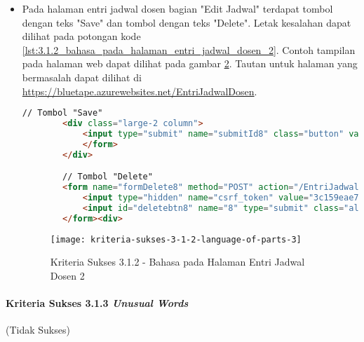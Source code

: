 \begin{itemize}
    \begin{figure}[H]
        \centering  
        \texttt{[image: kriteria-sukses-3-1-2-language-of-parts-2]}  
        \caption[Kriteria Sukses 3.1.2 - Bahasa pada Halaman Entri Jadwal Dosen 1]{Kriteria Sukses 3.1.2 - Bahasa pada Halaman Entri Jadwal Dosen 1}
        \label{fig:3.1.2_language_of_parts_2}  
    \end{figure}
    
    \item Pada halaman entri jadwal dosen bagian "Edit Jadwal" terdapat tombol dengan teks "Save" dan tombol dengan teks "Delete". Letak kesalahan dapat dilihat pada potongan kode \ref{lst:3.1.2_bahasa_pada_halaman_entri_jadwal_dosen_2}. Contoh tampilan pada halaman web dapat dilihat pada gambar \ref{fig:3.1.2_language_of_parts_3}. Tautan untuk halaman yang bermasalah dapat dilihat di \url{https://bluetape.azurewebsites.net/EntriJadwalDosen}.
    \begin{lstlisting}[frame=single, label={lst:3.1.2_bahasa_pada_halaman_entri_jadwal_dosen_2}, language=HTML, caption=Kriteria Sukses 3.1.2 - Bahasa yang Tidak Sesuai pada Halaman Entri Jadwal Dosen 2]
        // Tombol "Save"
        <div class="large-2 column">
            <input type="submit" name="submitId8" class="button" value="Save">
            </form>
        </div>

        // Tombol "Delete"
        <form name="formDelete8" method="POST" action="/EntriJadwalDosen/delete/8">    
            <input type="hidden" name="csrf_token" value="3c159eae7bc953dd591b679c080ed066"/>
            <input id="deletebtn8" name="8" type="submit" class="alert button" value="Delete">
        </form><div>
    \end{lstlisting}
    
    \begin{figure}[H]
        \centering  
        \texttt{[image: kriteria-sukses-3-1-2-language-of-parts-3]}  
        \caption[Kriteria Sukses 3.1.2 - Bahasa pada Halaman Entri Jadwal Dosen 2]{Kriteria Sukses 3.1.2 - Bahasa pada Halaman Entri Jadwal Dosen 2}
        \label{fig:3.1.2_language_of_parts_3}  
    \end{figure}
\end{itemize}

\paragraph{Kriteria Sukses 3.1.3 \textit{Unusual Words}}
\label{par:kepatuhan_bluetape_kriteria_sukses_3.1.3}
(Tidak Sukses)\\

